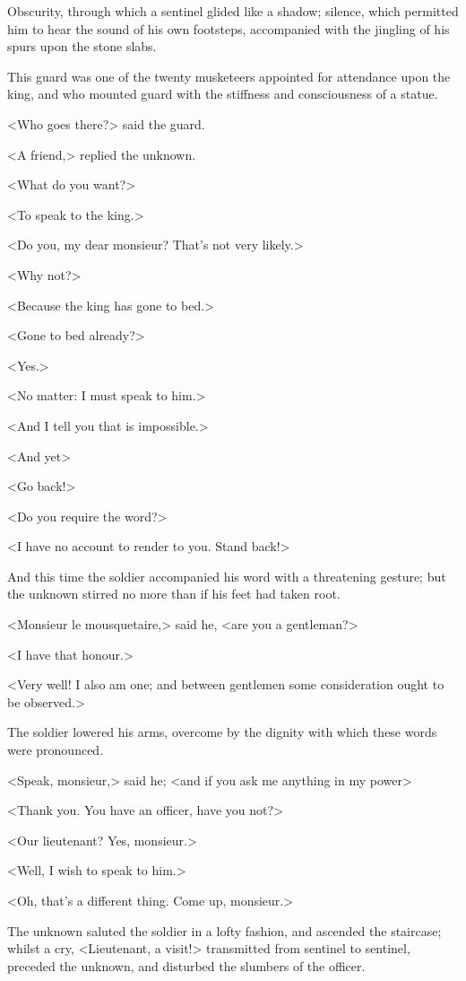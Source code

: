 Obscurity, through which a sentinel glided like a shadow; silence, which permitted him to hear the sound of his own footsteps, accompanied with the jingling of his spurs upon the stone slabs.

This guard was one of the twenty musketeers appointed for attendance upon the king, and who mounted guard with the stiffness and consciousness of a statue.

<Who goes there?> said the guard.

<A friend,> replied the unknown.

<What do you want?>

<To speak to the king.>

<Do you, my dear monsieur? That's not very likely.>

<Why not?>

<Because the king has gone to bed.>

<Gone to bed already?>

<Yes.>

<No matter: I must speak to him.>

<And I tell you that is impossible.>

<And yet\longdash>

<Go back!>

<Do you require the word?>

<I have no account to render to you. Stand back!>

And this time the soldier accompanied his word with a threatening gesture; but the unknown stirred no more than if his feet had taken root.

<Monsieur le mousquetaire,> said he, <are you a gentleman?>

<I have that honour.>

<Very well! I also am one; and between gentlemen some consideration ought to be observed.>

The soldier lowered his arms, overcome by the dignity with which these words were pronounced.

<Speak, monsieur,> said he; <and if you ask me anything in my power\longdash>

<Thank you. You have an officer, have you not?>

<Our lieutenant? Yes, monsieur.>

<Well, I wish to speak to him.>

<Oh, that's a different thing. Come up, monsieur.>

The unknown saluted the soldier in a lofty fashion, and ascended the staircase; whilst a cry, <Lieutenant, a visit!> transmitted from sentinel to sentinel, preceded the unknown, and disturbed the slumbers of the officer.

